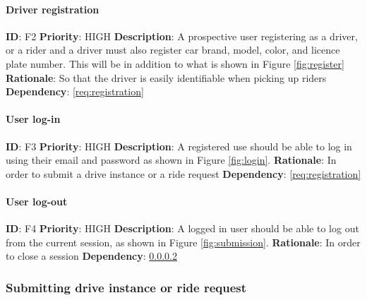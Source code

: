 \documentclass{article}
\begin{document}
\paragraph{Driver registration}\label{req:driverRegistration}
\textbf{ID}: F2\newline
\textbf{Priority}: HIGH\newline
\textbf{Description}: A prospective user registering as a driver, or a rider and a driver must also register car brand, model, color, and licence plate number. This will be in addition to what is shown in Figure \ref{fig:register}\newline
\textbf{Rationale}: So that the driver is easily identifiable when picking up riders\newline
\textbf{Dependency}: \ref{req:registration}\newline

\paragraph{User log-in}\label{req:log-in}
\textbf{ID}: F3\newline
\textbf{Priority}: HIGH\newline
\textbf{Description}: A registered use should be able to log in using their email and password as shown in Figure \ref{fig:login}. \newline
\textbf{Rationale}: In order to submit a drive instance or a ride request\newline
\textbf{Dependency}: \ref{req:registration}\newline

\paragraph{User log-out}\label{req:log-out}
\textbf{ID}: F4\newline
\textbf{Priority}: HIGH\newline
\textbf{Description}: A logged in user should be able to log out from the current session, as shown in Figure \ref{fig:submission}. \newline
\textbf{Rationale}: In order to close a session\newline
\textbf{Dependency}: \ref{req:log-in}\newline

\subsubsection{Submitting drive instance or ride request}
\end{document}

